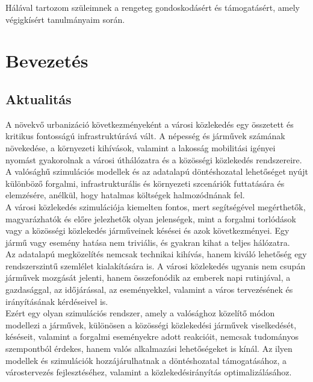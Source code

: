 \documentclass[14pt,a4paper]{extarticle}
\begin{document}
Hálával tartozom szüleimnek a rengeteg gondoskodásért és támogatásért, amely végigkísért tanulmányaim során.

\newpage

\setcounter{page}{1} %

\tableofcontents

\newpage


\section{Bevezetés}
\subsection{Aktualitás}
A növekvő urbanizáció következményeként a városi közlekedés egy összetett és kritikus fontosságú infrastruktúrává vált. A népesség és járművek számának növekedése, a környezeti kihívások, valamint a lakosság mobilitási igényei nyomást gyakorolnak a városi úthálózatra és a közösségi közlekedés rendszereire. A valósághű szimulációs modellek és az adatalapú döntéshozatal lehetőséget nyújt különböző forgalmi, infrastrukturális és környezeti szcenáriók futtatására és elemzésére, anélkül, hogy hatalmas költségek halmozódnának fel.
\\
A városi közlekedés szimulációja kiemelten fontos, mert segítségével megérthetők, magyarázhatók és előre jelezhetők olyan jelenségek, mint a forgalmi torlódások vagy a közösségi közlekedés járműveinek késései és azok következményei. Egy jármű vagy esemény hatása nem triviális, és gyakran kihat a teljes hálózatra.
\\
Az adatalapú megközelítés nemcsak technikai kihívás, hanem kiváló lehetőség egy rendszerszintű szemlélet kialakítására is. A városi közlekedés ugyanis nem csupán járművek mozgását jelenti, hanem összefonódik az emberek napi rutinjával, a gazdasággal, az időjárással, az eseményekkel, valamint a város tervezésének és irányításának kérdéseivel is.
\\
Ezért egy olyan szimulációs rendszer, amely a valósághoz közelítő módon modellezi a járművek, különösen a közösségi közlekedési járművek viselkedését, késéseit, valamint a forgalmi eseményekre adott reakcióit, nemcsak tudományos szempontból érdekes, hanem valós alkalmazási lehetőségeket is kínál. Az ilyen modellek és szimulációk hozzájárulhatnak a döntéshozatal támogatásához, a várostervezés fejlesztéséhez, valamint a közlekedésirányítás optimalizálásához.
\end{document}
